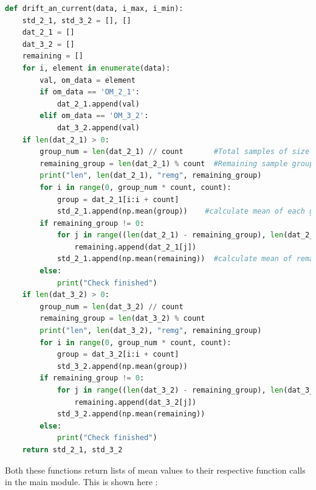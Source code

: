 \begin{lstlisting}[language = Python]
def drift_an_current(data, i_max, i_min):
    std_2_1, std_3_2 = [], []
    dat_2_1 = []
    dat_3_2 = []
    remaining = []
    for i, element in enumerate(data):
        val, om_data = element
        if om_data == 'OM_2_1':
            dat_2_1.append(val)
        elif om_data == 'OM_3_2':
            dat_3_2.append(val)
    if len(dat_2_1) > 0:
        group_num = len(dat_2_1) // count       #Total samples of size "count"
        remaining_group = len(dat_2_1) % count  #Remaining sample group size
        print("len", len(dat_2_1), "remg", remaining_group)
        for i in range(0, group_num * count, count):
            group = dat_2_1[i:i + count]
            std_2_1.append(np.mean(group))    #calculate mean of each group
        if remaining_group != 0:
            for j in range((len(dat_2_1) - remaining_group), len(dat_2_1)):
                remaining.append(dat_2_1[j])
            std_2_1.append(np.mean(remaining))  #calculate mean of remaining group
        else:
            print("Check finished")
    if len(dat_3_2) > 0:
        group_num = len(dat_3_2) // count
        remaining_group = len(dat_3_2) % count
        print("len", len(dat_3_2), "remg", remaining_group)
        for i in range(0, group_num * count, count):
            group = dat_3_2[i:i + count]
            std_3_2.append(np.mean(group))
        if remaining_group != 0:
            for j in range((len(dat_3_2) - remaining_group), len(dat_3_2)):
                remaining.append(dat_3_2[j])
            std_3_2.append(np.mean(remaining))
        else:
            print("Check finished")
    return std_2_1, std_3_2
\end{lstlisting}

\clearpage
Both these functions return lists of mean values to their respective function calls in the main module. This is shown here : 

